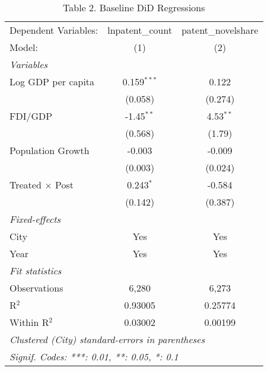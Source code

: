 \documentclass[12pt]{article}
\begin{document}
\begin{table}[htbp]
   \caption{Table 2. Baseline DiD Regressions}
   \centering
   \begin{tabular}{lcc}
      \tabularnewline \midrule \midrule
      Dependent Variables: & lnpatent\_count  & patent\_novelshare\\   
      Model:               & (1)              & (2)\\  
      \midrule
      \emph{Variables}\\
      Log GDP per capita   & 0.159$^{***}$    & 0.122\\   
                           & (0.058)          & (0.274)\\   
      FDI/GDP              & -1.45$^{**}$     & 4.53$^{**}$\\   
                           & (0.568)          & (1.79)\\   
      Population Growth    & -0.003           & -0.009\\   
                           & (0.003)          & (0.024)\\   
      Treated × Post       & 0.243$^{*}$      & -0.584\\   
                           & (0.142)          & (0.387)\\   
      \midrule
      \emph{Fixed-effects}\\
      City                 & Yes              & Yes\\  
      Year                 & Yes              & Yes\\  
      \midrule
      \emph{Fit statistics}\\
      Observations         & 6,280            & 6,273\\  
      R$^2$                & 0.93005          & 0.25774\\  
      Within R$^2$         & 0.03002          & 0.00199\\  
      \midrule \midrule
      \multicolumn{3}{l}{\emph{Clustered (City) standard-errors in parentheses}}\\
      \multicolumn{3}{l}{\emph{Signif. Codes: ***: 0.01, **: 0.05, *: 0.1}}\\
   \end{tabular}
\end{table}
\end{document}
